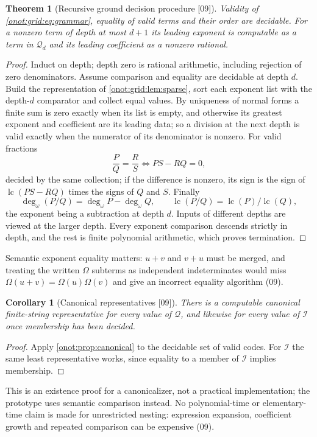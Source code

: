 \documentclass[11pt,oneside]{article}
\numberwithin{equation}{section}
\newtheorem{theorem}{Theorem}[section]
\newtheorem{corollary}[corollary]{Corollary}
\theoremstyle{definition}
\theoremstyle{remark}
\newcommand{\QO}{\mathcal Q}
\newcommand{\IO}{\mathcal I}
\newcommand{\lc}{\operatorname{lc}}
\newcommand{\ddeg}{\operatorname{deg}_{\omega}}
\newcommand{\Om}{\Omega}
\newcommand{\src}[1]{\textup{\textsf{\small[#1]}}}
\begin{document}
\begin{theorem}[Recursive ground decision procedure \src{09}]\label{onot:grid:thm:equality}
Validity of \eqref{onot:grid:eq:grammar}, equality of valid terms and their
order are decidable. For a nonzero term of depth at most $d+1$ its leading
exponent is computable as a term in $\QO_d$ and its leading coefficient as a
nonzero rational.
\end{theorem}
\begin{proof}
Induct on depth; depth zero is rational arithmetic, including rejection of zero
denominators. Assume comparison and equality are decidable at depth $d$. Build
the representation of \cref{onot:grid:lem:sparse}, sort each exponent list with
the depth-$d$ comparator and collect equal values. By uniqueness of normal forms
a finite sum is zero exactly when its list is empty, and otherwise its greatest
exponent and coefficient are its leading data; so a division at the next depth is
valid exactly when the numerator of its denominator is nonzero. For valid
fractions
\begin{equation}\label{onot:grid:eq:cross}
 \frac PQ=\frac RS\iff PS-RQ=0,
\end{equation}
decided by the same collection; if the difference is nonzero, its sign is the sign
of $\lc(PS-RQ)$ times the signs of $Q$ and $S$. Finally
\begin{equation}\label{onot:grid:eq:fractionleading}
 \ddeg(P/Q)=\ddeg P-\ddeg Q,\qquad \lc(P/Q)=\lc(P)/\lc(Q),
\end{equation}
the exponent being a subtraction at depth $d$. Inputs of different depths are
viewed at the larger depth. Every exponent comparison descends strictly in depth,
and the rest is finite polynomial arithmetic, which proves termination.
\end{proof}

Semantic exponent equality matters: $u+v$ and $v+u$ must be merged, and treating
the written $\Om$ subterms as independent indeterminates would miss
$\Om(u+v)=\Om(u)\Om(v)$ and give an incorrect equality algorithm (09).

\begin{corollary}[Canonical representatives \src{09}]\label{onot:grid:cor:canonical}
There is a computable canonical finite-string representative for every value of
$\QO$, and likewise for every value of $\IO$ once membership has been decided.
\end{corollary}
\begin{proof}
Apply \cref{onot:prop:canonical} to the decidable set of valid codes. For $\IO$
the same least representative works, since equality to a member of $\IO$ implies
membership.
\end{proof}
This is an existence proof for a canonicalizer, not a practical implementation;
the prototype uses semantic comparison instead. No polynomial-time or
elementary-time claim is made for unrestricted nesting: expression expansion,
coefficient growth and repeated comparison can be expensive (09).
\end{document}
